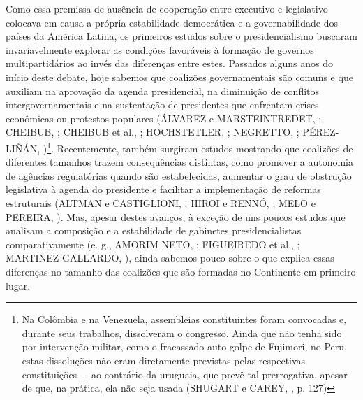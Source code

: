 Como essa premissa de ausência de cooperação entre executivo e legislativo colocava em causa a própria estabilidade democrática e a governabilidade dos países da América Latina, os primeiros estudos sobre o presidencialismo buscaram invariavelmente explorar as condições favoráveis à formação de governos multipartidários ao invés das diferenças entre estes. Passados alguns anos do início deste debate, hoje sabemos que coalizões governamentais são comuns e que auxiliam na aprovação da agenda presidencial, na diminuição de conflitos intergovernamentais e na sustentação de presidentes que enfrentam crises econômicas ou protestos populares (ÁLVAREZ e MARSTEINTREDET, \citeyear{alvarez2010}; CHEIBUB, \citeyear{cheibub2007}; CHEIBUB et al., \citeyear{cheibub2004}; HOCHSTETLER, \citeyear{hochstetler2006}; NEGRETTO, \citeyear{negretto2006}; PÉREZ-LIÑÁN, \citeyear{perez2007})\footnote{Na Colômbia e na Venezuela, assembleias constituintes foram convocadas e, durante seus trabalhos, dissolveram o congresso. Ainda que não tenha sido por intervenção militar, como o fracassado auto-golpe de Fujimori, no Peru, estas dissoluções não eram diretamente previstas pelas respectivas constituições –- ao contrário da uruguaia, que prevê tal prerrogativa, apesar de que, na prática, ela não seja usada (SHUGART e CAREY, \citeyear{shugart1992}, p. 127)}. Recentemente, também surgiram estudos mostrando que coalizões de diferentes tamanhos trazem consequências distintas, como promover a autonomia de agências regulatórias quando são estabelecidas, aumentar o grau de obstrução legislativa à agenda do presidente e facilitar a implementação de reformas estruturais (ALTMAN e CASTIGLIONI, \citeyear{altman2008}; HIROI e RENNÓ, \citeyear{hiroi2014}; MELO e PEREIRA, \citeyear{melo2013}). Mas, apesar destes avanços, à exceção de uns poucos estudos que analisam a composição e a estabilidade de gabinetes presidencialistas comparativamente (e. g., AMORIM NETO, \citeyear{neto2006}; FIGUEIREDO et al., \citeyear{figueiredo2012}; MARTINEZ-GALLARDO, \citeyear{martinez2012}), ainda sabemos pouco sobre o que explica essas diferenças no tamanho das coalizões que são formadas no Continente em primeiro lugar.

